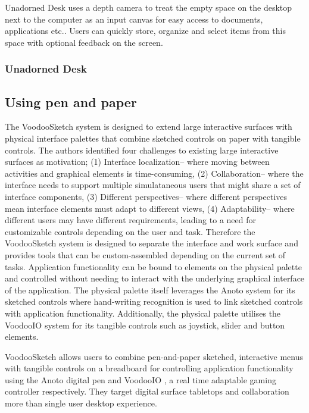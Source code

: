 Unadorned Desk \cite{hausen2012unadorned} uses a depth camera to treat the empty space on the desktop next to the computer as an input canvas for easy access to documents, applications etc.. Users can quickly store, organize and select items from this space with optional feedback on the screen.


\subsubsection{Unadorned Desk} %
\label{ssub:un}



\subsection{Using pen and paper} %
\label{sub:using_pen_and_paper}

The VoodooSketch system is designed to extend large interactive surfaces with physical interface palettes that combine sketched controls on paper with tangible controls. The authors identified four challenges to existing large interactive surfaces as motivation; (1) Interface localization-- where moving between activities and graphical elements is time-consuming, (2) Collaboration-- where the interface needs to support multiple simulataneous users that might share a set of interface components, (3) Different perspectives-- where different perspectives mean interface elements must adapt to different views, (4) Adaptability-- where different users may have different requirements, leading to a need for customizable controls depending on the user and task. Therefore the VoodooSketch system is designed to separate the interface and work surface and provides tools that can be custom-assembled depending on the current set of tasks. Application functionality can be bound to elements on the physical palette and controlled without needing to interact with the underlying graphical interface of the application. The physical palette itself leverages the Anoto\cite{anoto2011anoto} system for its sketched controls where hand-writing recognition is used to link sketched controls with application functionality. Additionally, the physical palette utilises the VoodooIO\cite{villar2007voodooio} system for its tangible controls such as joystick, slider and button elements.

VoodooSketch \cite{Block:2008:VEI:1347390.1347404} allows users to combine pen-and-paper sketched, interactive menus with tangible controls on a breadboard for controlling application functionality using the Anoto \cite{anoto2011anoto} digital pen and VoodooIO \cite{villar2007voodooio}, a real time adaptable gaming controller respectively. They target digital surface tabletops and collaboration more than single user desktop experience.\par


